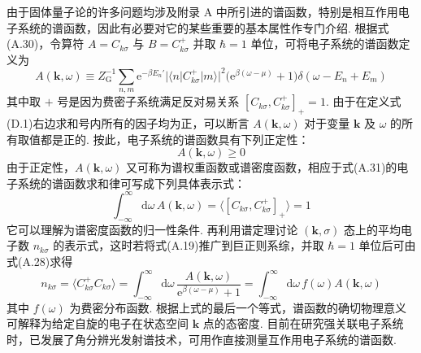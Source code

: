 由于固体量子论的许多问题均涉及附录 A 中所引进的谱函数，特别是相互作用电子系统的谱函数，因此有必要对它的某些重要的基本属性作专门介绍. 根据式(A.30)，令算符 $A=C_{k\sigma}$ 与 $B=C_{k\sigma}^{+}$ 并取 $\hbar=1$ 单位，可将电子系统的谱函数定义为
\begin{equation}
A(\boldsymbol{k},\omega)\equiv Z_{\mathrm{G}}^{-1}
\sum_{n,m}\mathrm{e}^{-\beta E_{n}'}
|\langle n|C_{k\sigma}^{+}|m\rangle|^{2}
\bigl(\mathrm{e}^{\beta(\omega-\mu)}+1\bigr)
\delta(\omega-E_{n}+E_{m})
\end{equation}
其中取 $+$ 号是因为费密子系统满足反对易关系
$[C_{k\sigma},C_{k\sigma}^{+}]_{+}=1$. 由于在定义式(D.1)右边求和号内所有的因子均为正，可以断言 $A(\boldsymbol{k},\omega)$ 对于变量 $\boldsymbol{k}$ 及 $\omega$ 的所有取值都是正的. 按此，电子系统的谱函数具有下列正定性：
\begin{equation}
A(\boldsymbol{k},\omega)\geqslant 0
\end{equation}
由于正定性，$A(\boldsymbol{k},\omega)$ 又可称为谱权重函数或谱密度函数，相应于式(A.31)的电子系统的谱函数求和律可写成下列具体表示式：
\begin{equation}
\int_{-\infty}^{\infty}\mathrm{d}\omega\,A(\boldsymbol{k},\omega)
=\langle[C_{k\sigma},C_{k\sigma}^{+}]_{+}\rangle=1
\end{equation}
它可以理解为谱密度函数的归一性条件. 再利用谱定理讨论
$(\boldsymbol{k},\sigma)$ 态上的平均电子数 $n_{k\sigma}$ 的表示式，这时若将式(A.19)推广到巨正则系综，并取 $\hbar=1$ 单位后可由式(A.28)求得
\begin{equation}
n_{k\sigma}=\langle C_{k\sigma}^{+}C_{k\sigma}\rangle
=\int_{-\infty}^{\infty}\mathrm{d}\omega\,
\frac{A(\boldsymbol{k},\omega)}{\mathrm{e}^{\beta(\omega-\mu)}+1}
=\int_{-\infty}^{\infty}\mathrm{d}\omega\,
f(\omega)A(\boldsymbol{k},\omega)
\end{equation}
其中 $f(\omega)$ 为费密分布函数. 根据上式的最后一个等式，谱函数的确切物理意义可解释为给定自旋的电子在状态空间 $\boldsymbol{k}$ 点的态密度. 目前在研究强关联电子系统时，已发展了角分辨光发射谱技术，可用作直接测量互作用电子系统的谱函数.

